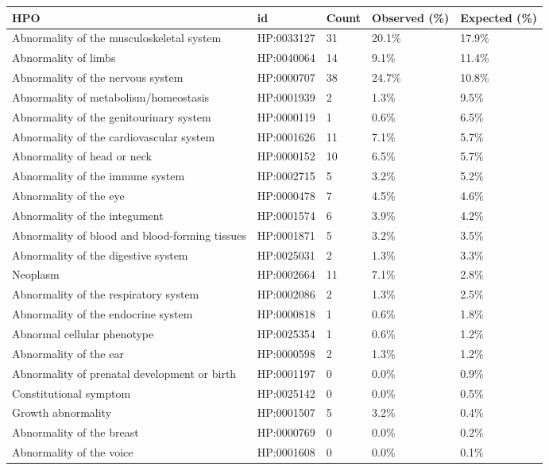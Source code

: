 \begin{table}
\centering
\begin{tabular}{>{\raggedright\arraybackslash}p{5.5cm}llll}
\toprule
\textbf{HPO} & \textbf{id} & \textbf{Count} & \textbf{Observed (\%)} & \textbf{Expected (\%)}\\
\midrule
Abnormality of the musculoskeletal system & HP:0033127 & 31 & 20.1\% & 17.9\%\\
Abnormality of limbs & HP:0040064 & 14 & 9.1\% & 11.4\%\\
Abnormality of the nervous system & HP:0000707 & 38 & 24.7\% & 10.8\%\\
Abnormality of metabolism/homeostasis & HP:0001939 & 2 & 1.3\% & 9.5\%\\
Abnormality of the genitourinary system & HP:0000119 & 1 & 0.6\% & 6.5\%\\
Abnormality of the cardiovascular system & HP:0001626 & 11 & 7.1\% & 5.7\%\\
Abnormality of head or neck & HP:0000152 & 10 & 6.5\% & 5.7\%\\
Abnormality of the immune system & HP:0002715 & 5 & 3.2\% & 5.2\%\\
Abnormality of the eye & HP:0000478 & 7 & 4.5\% & 4.6\%\\
Abnormality of the integument & HP:0001574 & 6 & 3.9\% & 4.2\%\\
Abnormality of blood and blood-forming tissues & HP:0001871 & 5 & 3.2\% & 3.5\%\\
Abnormality of the digestive system & HP:0025031 & 2 & 1.3\% & 3.3\%\\
Neoplasm & HP:0002664 & 11 & 7.1\% & 2.8\%\\
Abnormality of the respiratory system & HP:0002086 & 2 & 1.3\% & 2.5\%\\
Abnormality of the endocrine system & HP:0000818 & 1 & 0.6\% & 1.8\%\\
Abnormal cellular phenotype & HP:0025354 & 1 & 0.6\% & 1.2\%\\
Abnormality of the ear & HP:0000598 & 2 & 1.3\% & 1.2\%\\
Abnormality of prenatal development or birth & HP:0001197 & 0 & 0.0\% & 0.9\%\\
Constitutional symptom & HP:0025142 & 0 & 0.0\% & 0.5\%\\
Growth abnormality & HP:0001507 & 5 & 3.2\% & 0.4\%\\
Abnormality of the breast & HP:0000769 & 0 & 0.0\% & 0.2\%\\
Abnormality of the voice & HP:0001608 & 0 & 0.0\% & 0.1\%\\

\end{tabular}
\end{table}
